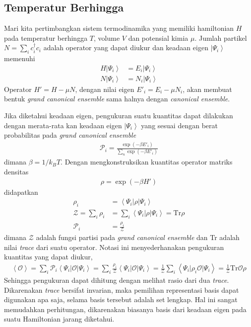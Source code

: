 \subsection{Temperatur Berhingga}
Mari kita pertimbangkan sistem termodinamika yang memiliki hamiltonian $H$ pada temperatur berhingga $T$, volume $V$ dan potensial kimia $\mu$. Jumlah partikel $N = \sum_{i} c^\dagger_i c_i$ adalah operator yang dapat diukur dan keadaan eigen $\left\vert \Psi_i \right\rangle$ memenuhi
\begin{align}
H \left\vert \Psi_i \right\rangle &= E_i \left\vert \Psi_i \right\rangle\\
N \left\vert \Psi_i \right\rangle &= N_i \left\vert \Psi_i \right\rangle
\end{align}
Operator $H' = H - \mu N$, dengan nilai eigen $E'_i = E_i - \mu N_i$, akan membuat bentuk \textit{grand canonical ensemble} sama halnya dengan \textit{canonical ensemble}.

Jika diketahui keadaan eigen, pengukuran suatu kuantitas dapat dilakukan dengan merata-rata kan keadaan eigen $\left\vert \Psi_i \right\rangle$ yang sesuai dengan berat probabilitas pada \textit{grand canonical ensemble}
\begin{align}
\mathcal{P}_i = \frac{\exp(-\beta E'_i)}{\sum_n \exp(-\beta E'_i)}
\end{align}
dimana $\beta = 1 / k_BT$. Dengan mengkonstruksikan kuantitas operator matriks densitas
\begin{align}
\rho = \exp(-\beta H')
\end{align}
didapatkan
\begin{align}
\rho_i &= \left\langle \Psi_i \vert \rho \vert \Psi_i \right\rangle\\
\mathcal{Z} = \sum_i \rho_i &= \sum_i \left\langle \Psi_i \vert \rho \vert \Psi_i \right\rangle = \text{Tr} \rho\\
\mathcal{P}_i &= \frac{\rho_i}{\mathcal{Z}}
\end{align}
dimana $\mathcal{Z}$ adalah fungsi partisi pada \textit{grand canonical ensemble} dan Tr adalah nilai \textit{trace} dari suatu operator. Notasi ini menyederhanakan pengukuran kuantitas yang dapat diukur, 
\begin{align}
\left\langle \mathcal{O}\right\rangle = \sum_i \mathcal{P}_i \left\langle \Psi_i \vert \mathcal{O} \vert \Psi_i \right\rangle = \sum_i \frac{\rho_i}{\mathcal{Z}}\left\langle \Psi_i \vert \mathcal{O} \vert \Psi_i \right\rangle = \frac{1}{\mathcal{Z}}\sum_i \left\langle \Psi_i \vert \rho_i\mathcal{O} \vert \Psi_i \right\rangle = \frac{1}{\mathcal{Z}} \text{Tr} \mathcal{O}\rho
\end{align}
Sehingga pengukuran dapat dihitung dengan melihat rasio dari dua \textit{trace}. Dikarenakan \textit{trace} bersifat invarian, maka pemilihan representasi basis dapat digunakan apa saja, selama basis tersebut adalah set lengkap. Hal ini sangat memudahkan perhitungan, dikarenakan biasanya basis dari keadaan eigen pada suatu Hamiltonian jarang diketahui.

